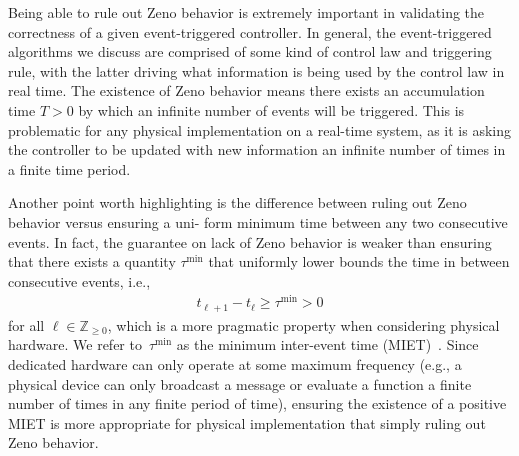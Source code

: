 \documentclass{autart}
\newcommand{\integernonnegative}{\mathbb{Z}_{\ge 0}}
\newcommand{\changes}[1]{{\color{blue} #1}}
\renewcommand{\changes}[1]{#1}
\begin{document}
\changes{Being able to rule out Zeno behavior is extremely important
  in validating the correctness of a given event-triggered controller.
  In general, the event-triggered algorithms we discuss are comprised
  of some kind of control law and triggering rule, with the latter
  driving what information is being used by the control law in real
  time. The existence of Zeno behavior means there exists an
  accumulation time $T > 0$ by which an infinite number of events will
  be triggered. This is problematic for any physical implementation on
  a real-time system, as it is asking the controller to be updated
  with new information an infinite number of times in a finite time
  period.

  Another point worth highlighting is the difference between ruling
  out Zeno behavior versus ensuring a uni- form minimum time between
  any two consecutive events. In fact, the guarantee on lack of Zeno
  behavior is weaker than ensuring that there exists a quantity
  $\tau^\text{min}$ that uniformly lower bounds the time in between
  consecutive events, i.e.,
  \begin{align*}
    t_{\ell+1} - t_\ell \geq \tau^\text{min} > 0
  \end{align*}
  for all $\ell \in \integernonnegative$, which is a more pragmatic
  property when considering physical hardware. We refer
  to~$\tau^\text{min}$ as the minimum inter-event time
  (MIET)~\citep{DPB-WPMHH:14}.  Since dedicated hardware can only
  operate at some maximum frequency (e.g., a physical device can only
  broadcast a message or evaluate a function a finite number of times
  in any finite period of time), ensuring the existence of a positive
  MIET is more appropriate for physical implementation that simply
  ruling out Zeno behavior.

}
\end{document}
